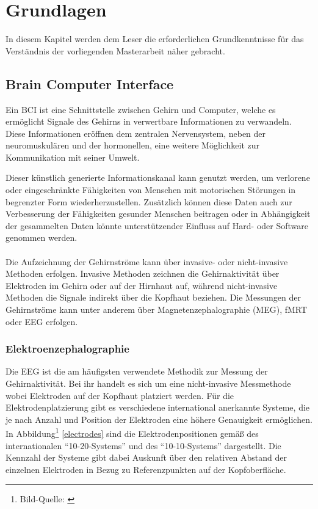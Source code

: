 \chapter{Grundlagen}
In diesem Kapitel werden dem Leser die erforderlichen Grundkenntnisse für das Verständnis der vorliegenden Masterarbeit näher gebracht. \\




\section{Brain Computer Interface}

Ein \ac{BCI} ist eine Schnittstelle zwischen Gehirn und Computer, 
welche es ermöglicht Signale des Gehirns in verwertbare Informationen zu verwandeln.
Diese Informationen eröffnen dem zentralen Nervensystem, neben der neuromuskulären und der hormonellen, 
eine weitere Möglichkeit zur Kommunikation mit seiner Umwelt.

Dieser künstlich generierte Informationskanal kann genutzt werden, 
um verlorene oder eingeschränkte Fähigkeiten von Menschen mit motorischen Störungen in begrenzter Form wiederherzustellen.
Zusätzlich können diese Daten auch zur Verbesserung der Fähigkeiten gesunder Menschen beitragen \cite[S.3]{wolpaw2012braincomputer} 
oder in Abhängigkeit der gesammelten Daten könnte unterstützender Einfluss auf Hard- oder Software genommen werden.\\ \\
Die Aufzeichnung der Gehirnströme kann über invasive- oder nicht-invasive Methoden erfolgen.
Invasive Methoden zeichnen die Gehirnaktivität über Elektroden im Gehirn oder auf der Hirnhaut auf, 
während nicht-invasive Methoden die Signale indirekt über die Kopfhaut beziehen.
Die Messungen der Gehirnströme kann unter anderem über Magnetenze\-phalographie (\acs{MEG}), \ac{fMRT} oder \ac{EEG} \cite{berger2008braincomputer} erfolgen.

\pagebreak
\subsection{Elektroenzephalographie}
\vspace{0.3cm}
Die \acf{EEG} ist die am häufigsten verwendete Methodik zur Messung der Gehirnaktivität.
Bei ihr handelt es sich um eine nicht-invasive Messmethode wobei Elektroden auf der Kopfhaut platziert werden.
Für die Elektrodenplatzierung gibt es verschiedene international anerkannte Systeme, die je nach Anzahl und Position der Elektroden eine höhere Genauigkeit ermöglichen.
In Abbildung\footnote[1]{Bild-Quelle: \cite{Oostenvald2001}} \ref{electrodes} sind die Elektrodenpositionen gemäß des internationalen "`10-20-Systems"' \cite[S.370-375]{Jasp58} und des "`10-10-Systems"' dargestellt.
Die Kennzahl der Systeme gibt dabei Auskunft über den relativen Abstand der einzelnen Elektroden in Bezug zu Referenzpunkten auf der Kopfoberfläche.\\


